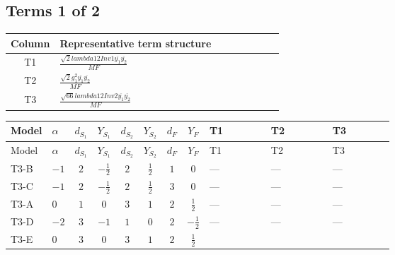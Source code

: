 \documentclass[8pt]{article}
\begin{document}
\begin{landscape}
\subsection*{Terms 1 of 2}
\begin{center}
\begin{tabular}{@{}c >{\raggedright\arraybackslash}p{0.82\linewidth}@{}}
\toprule
Column & Representative term structure \\
\midrule
T1 & \(\displaystyle \frac{\sqrt{2} lambda12Inv1 \overline{y_{1}} \overline{y_{2}}}{MF}\) \\
\midrule
T2 & \(\displaystyle \frac{\sqrt{2} g_{1}^{2} \overline{y_{1}} \overline{y_{2}}}{MF}\) \\
\midrule
T3 & \(\displaystyle \frac{\sqrt{66} lambda12Inv2 \overline{y_{1}} \overline{y_{2}}}{MF}\) \\
\midrule
\bottomrule
\end{tabular}
\end{center}
\smallskip
\tiny
\begin{longtable}{@{}llcccccc >{\raggedright\arraybackslash}p{0.21\linewidth} >{\raggedright\arraybackslash}p{0.21\linewidth} >{\raggedright\arraybackslash}p{0.21\linewidth}@{}}
\toprule
Model & $\alpha$ & $d_{S_1}$ & $Y_{S_1}$ & $d_{S_2}$ & $Y_{S_2}$ & $d_F$ & $Y_F$ & T1 & T2 & T3 \\
\midrule
\endfirsthead
\toprule
Model & $\alpha$ & $d_{S_1}$ & $Y_{S_1}$ & $d_{S_2}$ & $Y_{S_2}$ & $d_F$ & $Y_F$ & T1 & T2 & T3 \\
\midrule
\endhead
T3-B & $-1$ & $2$ & $-\frac{1}{2}$ & $2$ & $\frac{1}{2}$ & $1$ & $0$ & --- & --- & --- \\
\midrule
T3-C & $-1$ & $2$ & $-\frac{1}{2}$ & $2$ & $\frac{1}{2}$ & $3$ & $0$ & --- & --- & --- \\
\midrule
T3-A & $0$ & $1$ & $0$ & $3$ & $1$ & $2$ & $\frac{1}{2}$ & --- & --- & --- \\
\midrule
T3-D & $-2$ & $3$ & $-1$ & $1$ & $0$ & $2$ & $-\frac{1}{2}$ & --- & --- & --- \\
\midrule
T3-E & $0$ & $3$ & $0$ & $3$ & $1$ & $2$ & $\frac{1}{2}$ & \scriptsize\adjustbox{max width=\linewidth}{$\begin{gathered} - \frac{\sqrt{2} lambda12Inv1 \overline{y_{1}} \overline{y_{2}}}{4 MF}\end{gathered}$} & \scriptsize\adjustbox{max width=\linewidth}{$\begin{gathered} \frac{3 \sqrt{2} g_{1}^{2} \overline{y_{1}} \overline{y_{2}}}{16 MF}\end{gathered}$} & \scriptsize\adjustbox{max width=\linewidth}{$\begin{gathered} \frac{3 \sqrt{66} lambda12Inv2 \overline{y_{1}} \overline{y_{2}}}{44 MF}\end{gathered}$} \\
\midrule
\bottomrule
\end{longtable}
\clearpage

\end{landscape}
\end{document}
